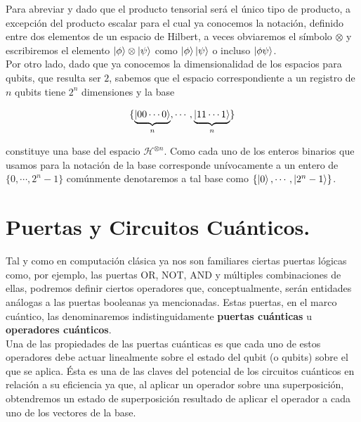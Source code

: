 \documentclass[11pt, spanish]{report}
\numberwithin{equation}{section}
\numberwithin{defin}{section}
\begin{document}
Para abreviar y dado que el producto tensorial será el único tipo de producto, a excepción del producto escalar para el cual ya conocemos la notación, definido entre dos elementos de un espacio de Hilbert, a veces obviaremos el símbolo $\otimes$ y escribiremos el elemento $\ket{\phi}\otimes \ket{\psi}$ como $\ket{\phi}\ket{\psi}$ o incluso $\ket{\phi\psi}$.\\

Por otro lado, dado que ya conocemos la dimensionalidad de los espacios para qubits, que resulta ser $2$, sabemos que el espacio correspondiente a un registro de $n$ qubits tiene $2^n$ dimensiones y la base

\begin{equation}
\{\underbrace{\ket{00\cdots 0}}_n,\cdots,\underbrace{\ket{11\cdots 1}}_n\}
\end{equation}

\noindent constituye una base del espacio $\mathcal{H}^{\otimes n}$. Como cada uno de los enteros binarios que usamos para la notación de la base corresponde unívocamente a un entero de $\{0,\cdots, 2^n-1\}$ comúnmente denotaremos a tal base como $\{\ket{0},\cdots,\ket{2^n-1}\}$.\\



\section{Puertas y Circuitos Cuánticos.}

Tal y como en computación clásica ya nos son familiares ciertas puertas lógicas como, por ejemplo, las puertas OR, NOT, AND y múltiples combinaciones de ellas, podremos definir ciertos operadores que, conceptualmente, serán entidades análogas a las puertas booleanas ya mencionadas. Estas puertas, en el marco cuántico, las denominaremos indistinguidamente \textbf{puertas cuánticas} u \textbf{operadores cuánticos}.   \\

Una de las propiedades de las puertas cuánticas es que cada uno de estos operadores debe actuar linealmente\footnotemark{} sobre el estado del qubit (o qubits) sobre el que se aplica. Ésta es una de las claves del potencial de los circuitos cuánticos en relación a su eficiencia ya que, al aplicar un operador sobre una superposición, obtendremos un estado de superposición resultado de aplicar el operador a cada uno de los vectores de la base.\\
\end{document}
